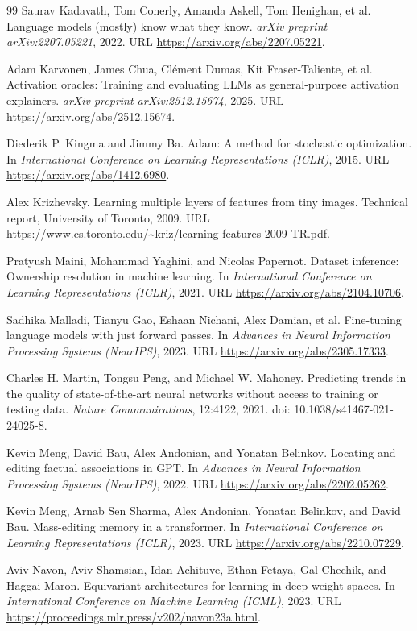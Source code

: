 \documentclass[11pt]{article}
\begin{document}
\begin{thebibliography}{99}
 Saurav Kadavath, Tom Conerly, Amanda Askell, Tom Henighan, et al. Language models (mostly) know what they know. \emph{arXiv preprint arXiv:2207.05221}, 2022. URL \url{https://arxiv.org/abs/2207.05221}.

 Adam Karvonen, James Chua, Cl\'ement Dumas, Kit Fraser-Taliente, et al. Activation oracles: Training and evaluating LLMs as general-purpose activation explainers. \emph{arXiv preprint arXiv:2512.15674}, 2025. URL \url{https://arxiv.org/abs/2512.15674}.

 Diederik P. Kingma and Jimmy Ba. Adam: A method for stochastic optimization. In \emph{International Conference on Learning Representations (ICLR)}, 2015. URL \url{https://arxiv.org/abs/1412.6980}.

 Alex Krizhevsky. Learning multiple layers of features from tiny images. Technical report, University of Toronto, 2009. URL \url{https://www.cs.toronto.edu/~kriz/learning-features-2009-TR.pdf}.

 Pratyush Maini, Mohammad Yaghini, and Nicolas Papernot. Dataset inference: Ownership resolution in machine learning. In \emph{International Conference on Learning Representations (ICLR)}, 2021. URL \url{https://arxiv.org/abs/2104.10706}.

 Sadhika Malladi, Tianyu Gao, Eshaan Nichani, Alex Damian, et al. Fine-tuning language models with just forward passes. In \emph{Advances in Neural Information Processing Systems (NeurIPS)}, 2023. URL \url{https://arxiv.org/abs/2305.17333}.

 Charles H. Martin, Tongsu Peng, and Michael W. Mahoney. Predicting trends in the quality of state-of-the-art neural networks without access to training or testing data. \emph{Nature Communications}, 12:4122, 2021. doi: 10.1038/s41467-021-24025-8.

 Kevin Meng, David Bau, Alex Andonian, and Yonatan Belinkov. Locating and editing factual associations in GPT. In \emph{Advances in Neural Information Processing Systems (NeurIPS)}, 2022. URL \url{https://arxiv.org/abs/2202.05262}.

 Kevin Meng, Arnab Sen Sharma, Alex Andonian, Yonatan Belinkov, and David Bau. Mass-editing memory in a transformer. In \emph{International Conference on Learning Representations (ICLR)}, 2023. URL \url{https://arxiv.org/abs/2210.07229}.

 Aviv Navon, Aviv Shamsian, Idan Achituve, Ethan Fetaya, Gal Chechik, and Haggai Maron. Equivariant architectures for learning in deep weight spaces. In \emph{International Conference on Machine Learning (ICML)}, 2023. URL \url{https://proceedings.mlr.press/v202/navon23a.html}.


\end{thebibliography}
\end{document}
